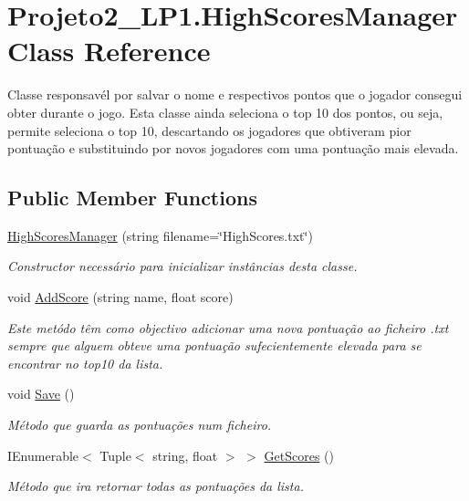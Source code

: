 \hypertarget{class_projeto2___l_p1_1_1_high_scores_manager}{}\section{Projeto2\+\_\+\+L\+P1.\+High\+Scores\+Manager Class Reference}
\label{class_projeto2___l_p1_1_1_high_scores_manager}


Classe responsavél por salvar o nome e respectivos pontos que o jogador consegui obter durante o jogo. Esta classe ainda seleciona o top 10 dos pontos, ou seja, permite seleciona o top 10, descartando os jogadores que obtiveram pior pontuação e substituindo por novos jogadores com uma pontuação mais elevada.  


\subsection*{Public Member Functions}
\begin{DoxyCompactItemize}
\item 
\mbox{\hyperlink{class_projeto2___l_p1_1_1_high_scores_manager_a3fe673d1f5965bdb24a8a6b69cb5de60}{High\+Scores\+Manager}} (string filename=\char`\"{}High\+Scores.\+txt\char`\"{})
\begin{DoxyCompactList}\small\item\em Constructor necessário para inicializar instâncias desta classe. \end{DoxyCompactList}\item 
void \mbox{\hyperlink{class_projeto2___l_p1_1_1_high_scores_manager_a51b97739e840ce7c0c15605d40e90072}{Add\+Score}} (string name, float score)
\begin{DoxyCompactList}\small\item\em Este metódo têm como objectivo adicionar uma nova pontuação ao ficheiro .txt sempre que alguem obteve uma pontuação sufecientemente elevada para se encontrar no top10 da lista. \end{DoxyCompactList}\item 
void \mbox{\hyperlink{class_projeto2___l_p1_1_1_high_scores_manager_a24db9e36a1e0430ad3e8cf57492c0d1b}{Save}} ()
\begin{DoxyCompactList}\small\item\em Método que guarda as pontuações num ficheiro. \end{DoxyCompactList}\item 
I\+Enumerable$<$ Tuple$<$ string, float $>$ $>$ \mbox{\hyperlink{class_projeto2___l_p1_1_1_high_scores_manager_ac794eb432e647a6daf21db6673a72fa3}{Get\+Scores}} ()
\begin{DoxyCompactList}\small\item\em Método que ira retornar todas as pontuações da lista. \end{DoxyCompactList}\end{DoxyCompactItemize}


